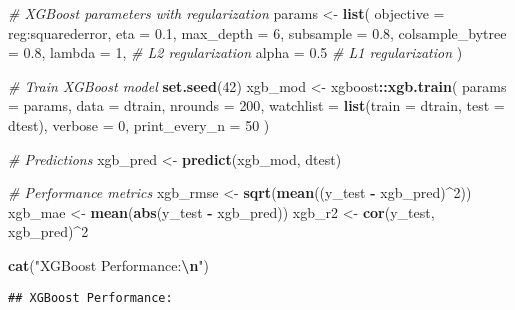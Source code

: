 \documentclass[
]{article}
\newenvironment{Shaded}{\begin{snugshade}}{\end{snugshade}}
\newcommand{\AttributeTok}[1]{\textcolor[rgb]{0.13,0.29,0.53}{#1}}
\newcommand{\CommentTok}[1]{\textcolor[rgb]{0.56,0.35,0.01}{\textit{#1}}}
\newcommand{\DecValTok}[1]{\textcolor[rgb]{0.00,0.00,0.81}{#1}}
\newcommand{\FloatTok}[1]{\textcolor[rgb]{0.00,0.00,0.81}{#1}}
\newcommand{\FunctionTok}[1]{\textcolor[rgb]{0.13,0.29,0.53}{\textbf{#1}}}
\newcommand{\NormalTok}[1]{#1}
\newcommand{\OtherTok}[1]{\textcolor[rgb]{0.56,0.35,0.01}{#1}}
\newcommand{\SpecialCharTok}[1]{\textcolor[rgb]{0.81,0.36,0.00}{\textbf{#1}}}
\newcommand{\StringTok}[1]{\textcolor[rgb]{0.31,0.60,0.02}{#1}}
\begin{document}
\begin{Shaded}
\begin{Highlighting}[]
\CommentTok{\# XGBoost parameters with regularization}
\NormalTok{params }\OtherTok{\textless{}{-}} \FunctionTok{list}\NormalTok{(}
  \AttributeTok{objective =} \StringTok{\textquotesingle{}reg:squarederror\textquotesingle{}}\NormalTok{,}
  \AttributeTok{eta =} \FloatTok{0.1}\NormalTok{,}
  \AttributeTok{max\_depth =} \DecValTok{6}\NormalTok{,}
  \AttributeTok{subsample =} \FloatTok{0.8}\NormalTok{,}
  \AttributeTok{colsample\_bytree =} \FloatTok{0.8}\NormalTok{,}
  \AttributeTok{lambda =} \DecValTok{1}\NormalTok{,  }\CommentTok{\# L2 regularization}
  \AttributeTok{alpha =} \FloatTok{0.5}   \CommentTok{\# L1 regularization}
\NormalTok{)}

\CommentTok{\# Train XGBoost model}
\FunctionTok{set.seed}\NormalTok{(}\DecValTok{42}\NormalTok{)}
\NormalTok{xgb\_mod }\OtherTok{\textless{}{-}}\NormalTok{ xgboost}\SpecialCharTok{::}\FunctionTok{xgb.train}\NormalTok{(}
  \AttributeTok{params =}\NormalTok{ params,}
  \AttributeTok{data =}\NormalTok{ dtrain,}
  \AttributeTok{nrounds =} \DecValTok{200}\NormalTok{,}
  \AttributeTok{watchlist =} \FunctionTok{list}\NormalTok{(}\AttributeTok{train =}\NormalTok{ dtrain, }\AttributeTok{test =}\NormalTok{ dtest),}
  \AttributeTok{verbose =} \DecValTok{0}\NormalTok{,}
  \AttributeTok{print\_every\_n =} \DecValTok{50}
\NormalTok{)}

\CommentTok{\# Predictions}
\NormalTok{xgb\_pred }\OtherTok{\textless{}{-}} \FunctionTok{predict}\NormalTok{(xgb\_mod, dtest)}

\CommentTok{\# Performance metrics}
\NormalTok{xgb\_rmse }\OtherTok{\textless{}{-}} \FunctionTok{sqrt}\NormalTok{(}\FunctionTok{mean}\NormalTok{((y\_test }\SpecialCharTok{{-}}\NormalTok{ xgb\_pred)}\SpecialCharTok{\^{}}\DecValTok{2}\NormalTok{))}
\NormalTok{xgb\_mae }\OtherTok{\textless{}{-}} \FunctionTok{mean}\NormalTok{(}\FunctionTok{abs}\NormalTok{(y\_test }\SpecialCharTok{{-}}\NormalTok{ xgb\_pred))}
\NormalTok{xgb\_r2 }\OtherTok{\textless{}{-}} \FunctionTok{cor}\NormalTok{(y\_test, xgb\_pred)}\SpecialCharTok{\^{}}\DecValTok{2}

\FunctionTok{cat}\NormalTok{(}\StringTok{"XGBoost Performance:}\SpecialCharTok{\textbackslash{}n}\StringTok{"}\NormalTok{)}
\end{Highlighting}
\end{Shaded}

\begin{verbatim}
## XGBoost Performance:
\end{verbatim}
\end{document}
